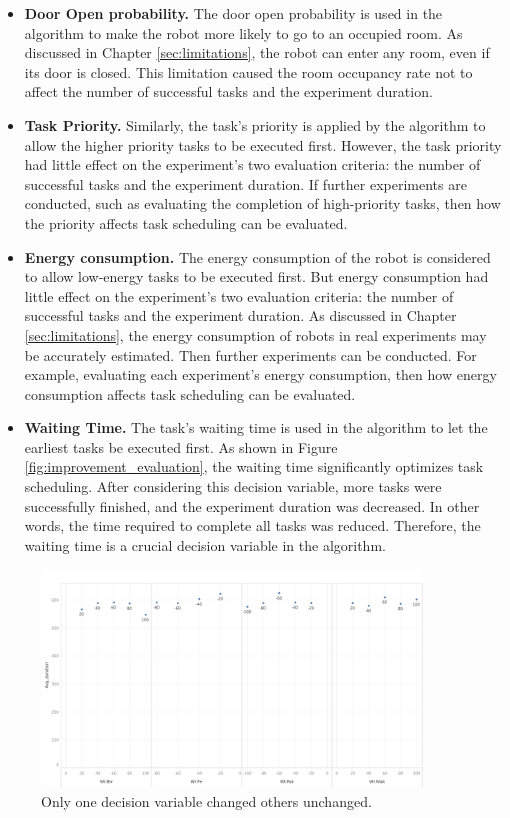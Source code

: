 \begin{itemize}
 \item \textbf{Door Open probability.} The door open probability is used in the algorithm to make the robot more likely to go to an occupied room. As discussed in Chapter \ref{sec:limitations}, the robot can enter any room, even if its door is closed. This limitation caused the room occupancy rate not to affect the number of successful tasks and the experiment duration.
 \item \textbf{Task Priority.} Similarly, the task's priority is applied by the algorithm to allow the higher priority tasks to be executed first. However, the task priority had little effect on the experiment's two evaluation criteria: the number of successful tasks and the experiment duration. If further experiments are conducted, such as evaluating the completion of high-priority tasks, then how the priority affects task scheduling can be evaluated.
 \item \textbf{Energy consumption.} The energy consumption of the robot is considered to allow low-energy tasks to be executed first. But energy consumption had little effect on the experiment's two evaluation criteria: the number of successful tasks and the experiment duration. As discussed in Chapter \ref{sec:limitations}, the energy consumption of robots in real experiments may be accurately estimated. Then further experiments can be conducted. For example, evaluating each experiment's energy consumption, then how energy consumption affects task scheduling can be evaluated.
 \item \textbf{Waiting Time.} The task's waiting time is used in the algorithm to let the earliest tasks be executed first. As shown in Figure \ref{fig:improvement_evaluation}, the waiting time significantly optimizes task scheduling. After considering this decision variable, more tasks were successfully finished, and the experiment duration was decreased. In other words, the time required to complete all tasks was reduced. Therefore, the waiting time is a crucial decision variable in the algorithm.
\end{itemize}

\begin{figure}[htbp]
 \centering
 \includegraphics[width = 0.9\textwidth]{content/images/ch5/one_decision_variable.png}
 \caption{Only one decision variable changed others unchanged.}
 \label{fig:only_one_decision_variable_changed}
\end{figure}

